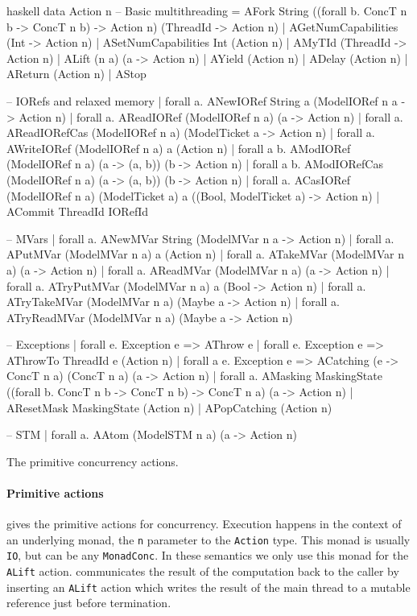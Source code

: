 \begin{listing}
\centering
\begin{cminted}{haskell}
data Action n
  -- Basic multithreading
  = AFork String ((forall b. ConcT n b -> ConcT n b) -> Action n)
      (ThreadId -> Action n)
  | AGetNumCapabilities     (Int -> Action n)
  | ASetNumCapabilities Int        (Action n)
  | AMyTId (ThreadId -> Action n)
  | ALift  (n a)  (a -> Action n)
  | AYield             (Action n)
  | ADelay             (Action n)
  | AReturn            (Action n)
  | AStop

  -- IORefs and relaxed memory
  | forall a.   ANewIORef     String           a (ModelIORef n a -> Action n)
  | forall a.   AReadIORef    (ModelIORef n a)                (a -> Action n)
  | forall a.   AReadIORefCas (ModelIORef n a)    (ModelTicket a -> Action n)
  | forall a.   AWriteIORef   (ModelIORef n a) a                   (Action n)
  | forall a b. AModIORef     (ModelIORef n a) (a -> (a, b))  (b -> Action n)
  | forall a b. AModIORefCas  (ModelIORef n a) (a -> (a, b))  (b -> Action n)
  | forall a.   ACasIORef (ModelIORef n a) (ModelTicket a) a
      ((Bool, ModelTicket a) -> Action n)
  | ACommit ThreadId IORefId

  -- MVars
  | forall a. ANewMVar     String            (ModelMVar n a -> Action n)
  | forall a. APutMVar     (ModelMVar n a) a                  (Action n)
  | forall a. ATakeMVar    (ModelMVar n a)               (a -> Action n)
  | forall a. AReadMVar    (ModelMVar n a)               (a -> Action n)
  | forall a. ATryPutMVar  (ModelMVar n a) a          (Bool -> Action n)
  | forall a. ATryTakeMVar (ModelMVar n a)         (Maybe a -> Action n)
  | forall a. ATryReadMVar (ModelMVar n a)         (Maybe a -> Action n)

  -- Exceptions
  | forall e.   Exception e => AThrow e
  | forall e.   Exception e => AThrowTo ThreadId e (Action n)
  | forall a e. Exception e => ACatching (e -> ConcT n a) (ConcT n a)
      (a -> Action n)
  | forall a.   AMasking MaskingState
      ((forall b. ConcT n b -> ConcT n b) -> ConcT n a) (a -> Action n)
  | AResetMask   MaskingState (Action n)
  | APopCatching              (Action n)

  -- STM
  | forall a. AAtom (ModelSTM n a) (a -> Action n)
\end{cminted}
\caption{The primitive concurrency actions.}\label{lst:actionty}
\end{listing}

\paragraph{Primitive actions}
 gives the primitive actions for concurrency.
Execution happens in the context of an underlying monad, the \verb|n|
parameter to the \verb|Action| type.  This monad is usually \verb|IO|,
but can be any \verb|MonadConc|.  In these semantics we only use this
monad for the \verb|ALift| action.  \dejafu{} communicates the result
of the computation back to the caller by inserting an \verb|ALift|
action which writes the result of the main thread to a mutable
reference just before termination.

